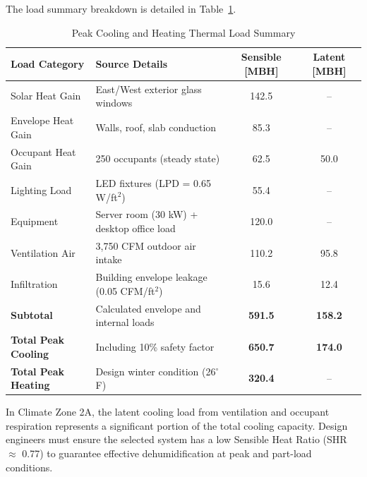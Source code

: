 The load summary breakdown is detailed in Table~\ref{tab:load_summary}.

\begin{table}[htbp]
\centering
\caption{Peak Cooling and Heating Thermal Load Summary}
\label{tab:load_summary}
\begin{tabularx}{\textwidth}{l X c c}
\toprule
\textbf{Load Category} & \textbf{Source Details} & \textbf{Sensible [MBH]} & \textbf{Latent [MBH]} \\
\midrule
Solar Heat Gain & East/West exterior glass windows & 142.5 & -- \\
Envelope Heat Gain & Walls, roof, slab conduction & 85.3 & -- \\
Occupant Heat Gain & 250 occupants (steady state) & 62.5 & 50.0 \\
Lighting Load & LED fixtures (LPD = 0.65 W/ft$^{2}$) & 55.4 & -- \\
Equipment & Server room (30 kW) + desktop office load & 120.0 & -- \\
Ventilation Air & 3,750 CFM outdoor air intake & 110.2 & 95.8 \\
Infiltration & Building envelope leakage (0.05 CFM/ft$^{2}$) & 15.6 & 12.4 \\
\midrule
\textbf{Subtotal} & Calculated envelope and internal loads & \textbf{591.5} & \textbf{158.2} \\
\midrule
\textbf{Total Peak Cooling} & Including 10\% safety factor & \textbf{650.7} & \textbf{174.0} \\
\textbf{Total Peak Heating} & Design winter condition (26$^{\circ}$F) & \textbf{320.4} & -- \\
\bottomrule
\end{tabularx}
\end{table}

\begin{designbox}[title=Engineering Design Tip: High Latent Loads]
In Climate Zone 2A, the latent cooling load from ventilation and occupant respiration represents a significant portion of the total cooling capacity. Design engineers must ensure the selected system has a low Sensible Heat Ratio (SHR $\approx$ 0.77) to guarantee effective dehumidification at peak and part-load conditions.
\end{designbox}
